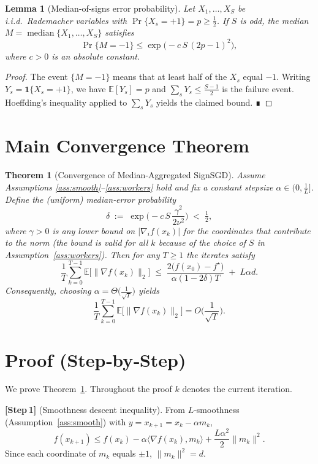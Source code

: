 \documentclass[11pt]{article}
\newcommand{\E}{\mathbb{E}}
\newtheorem{theorem}{Theorem}
\newtheorem{lemma}{Lemma}
\begin{document}
\begin{lemma}[Median‑of‑signs error probability]\label{lem:median_error}
Let $X_{1},\dots,X_{S}$ be i.i.d.\ Rademacher variables with
$\Pr\{X_{s}=+1\}=p\ge\frac12$.  If $S$ is odd, the median $M=\operatorname{median}\{X_{1},\dots,X_{S}\}$
satisfies
\[
    \Pr\{M=-1\}\le \exp\!\big(-c\,S\,(2p-1)^{2}\big),
\]
where $c>0$ is an absolute constant.
\end{lemma}
\begin{proof}
The event $\{M=-1\}$ means that at least half of the $X_{s}$ equal $-1$.
Writing $Y_{s}=\mathbf{1}\{X_{s}=+1\}$, we have $\E[Y_{s}]=p$ and
$\sum_{s}Y_{s}\le \frac{S-1}{2}$ is the failure event.
Hoeffding’s inequality applied to $\sum_{s}Y_{s}$ yields the claimed bound. ∎
\end{proof}

\section*{Main Convergence Theorem}
\begin{theorem}[Convergence of Median‑Aggregated SignSGD]\label{thm:main}
Assume Assumptions \ref{ass:smooth}–\ref{ass:workers} hold and fix a constant stepsize
$\alpha\in\big(0,\frac{1}{L}\big]$.
Define the (uniform) median‑error probability
\[
    \delta \;:=\; \exp\!\Big(-c\,S\,\frac{\gamma^{2}}{2\nu^{2}}\Big)\;<\;\tfrac12,
\]
where $\gamma>0$ is any lower bound on $|\nabla_{i}f(x_{k})|$ for the coordinates that
contribute to the norm (the bound is valid for all $k$ because of the
choice of $S$ in Assumption~\ref{ass:workers}).
Then for any $T\ge 1$ the iterates satisfy
\[
    \frac{1}{T}\sum_{k=0}^{T-1}\E\!\big[\|\nabla f(x_{k})\|_{2}\big]
    \;\le\;
    \frac{2\big(f(x_{0})-f^{\star}\big)}{\alpha(1-2\delta)T}
    \;+\;
    L\alpha d .
\tag{1}
\]
Consequently, choosing $\alpha = \Theta\!\big(\tfrac{1}{\sqrt{T}}\big)$ yields
\[
    \frac{1}{T}\sum_{k=0}^{T-1}\E\!\big[\|\nabla f(x_{k})\|_{2}\big]
    = O\!\Big(\frac{1}{\sqrt{T}}\Big).
\]
\end{theorem}

\section*{Proof (Step‑by‑Step)}
We prove Theorem~\ref{thm:main}. Throughout the proof $k$ denotes the current
iteration.

\noindent\textbf{[Step 1]} (Smoothness descent inequality).  
From $L$‑smoothness (Assumption~\ref{ass:smooth}) with $y=x_{k+1}=x_{k}-\alpha m_{k}$,
\[
    f(x_{k+1})\le f(x_{k})-\alpha\langle\nabla f(x_{k}),m_{k}\rangle
    +\frac{L\alpha^{2}}{2}\|m_{k}\|^{2}.
\tag{2}
\]
Since each coordinate of $m_{k}$ equals $\pm1$, $\|m_{k}\|^{2}=d$.
\end{document}
